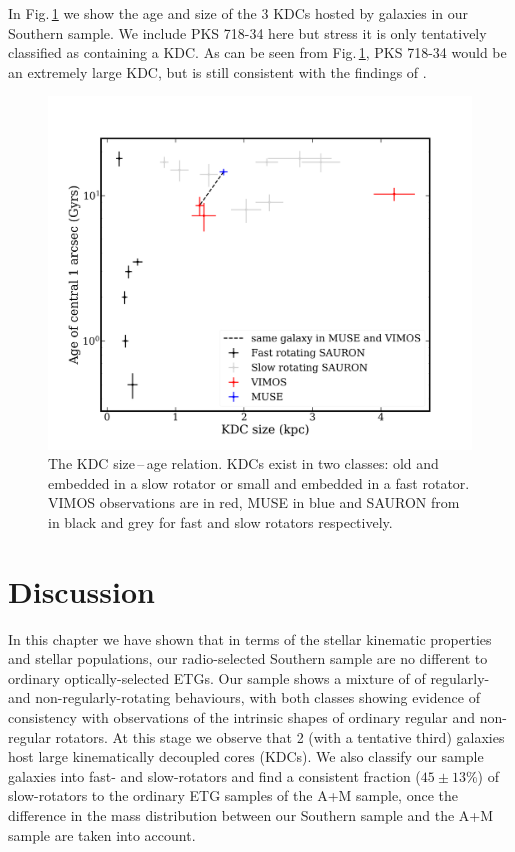 		In Fig.\,\ref{fig:KDC} we show the age and size of the 3 KDCs hosted by galaxies in our Southern sample. We include PKS 718-34 here but stress it is only tentatively classified as containing a KDC. As can be seen from Fig.\,\ref{fig:KDC}, PKS 718-34 would be an extremely large KDC, but is still consistent with the findings of \citet{Kuntschner2010}.

		\begin{figure}[t]
			\centering
			\includegraphics[width=.7\textwidth]{chapter4/KDC_size_age.png}
			\caption[KDC dichotomy]{The KDC size\,--\,age relation. KDCs exist in two classes: old and embedded in a slow rotator or small and embedded in a fast rotator. VIMOS observations are in red, MUSE in blue and SAURON from \citet{Kuntschner2010} in black and grey for fast and slow rotators respectively.}
			\label{fig:KDC}
		\end{figure}
	
\section{Discussion}
	\label{sec:stellarDiscussion}
	In this chapter we have shown that in terms of the stellar kinematic properties and stellar populations, our radio-selected Southern sample are no different to ordinary optically-selected ETGs. Our sample shows a mixture of of regularly- and non-regularly-rotating behaviours, with both classes showing evidence of consistency with observations of the intrinsic shapes of ordinary regular and non-regular rotators. At this stage we observe that 2 (with a tentative third) galaxies host large kinematically decoupled cores (KDCs). We also classify our sample galaxies into fast- and slow-rotators and find a consistent fraction ($45\pm13$\%) of slow-rotators to the ordinary ETG samples of the A+M sample, once the difference in the mass distribution between our Southern sample and the A+M sample are taken into account. 

